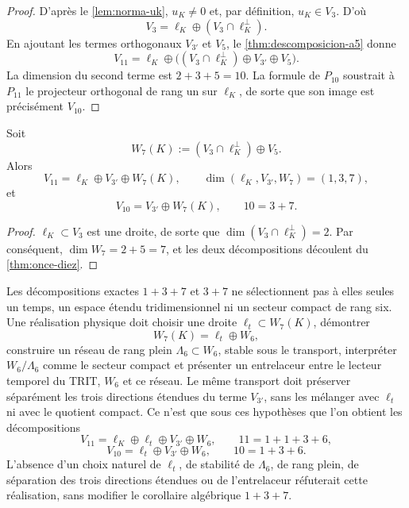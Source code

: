 \begin{proof}
D'après le \cref{lem:norma-uk}, \(u_K\neq0\) et, par définition, \(u_K\in V_3\).
D'où
\[
V_3=\ell_K\oplus(V_3\cap\ell_K^\perp).
\]
En ajoutant les termes orthogonaux \(V_{3'}\) et \(V_5\), le
\cref{thm:descomposicion-a5} donne
\[
V_{11}=\ell_K\oplus
\bigl((V_3\cap\ell_K^\perp)\oplus V_{3'}\oplus V_5\bigr).
\]
La dimension du second terme est \(2+3+5=10\). La formule de \(P_{10}\)
soustrait à \(P_{11}\) le projecteur orthogonal de rang un sur \(\ell_K\), de
sorte que son image est précisément \(V_{10}\).
\end{proof}

\begin{corollary}
\label{cor:descomposicion-1-3-7}
Soit
\[
W_7(K):=(V_3\cap\ell_K^\perp)\oplus V_5.
\]
Alors
\[
\boxed{
V_{11}=\ell_K\oplus V_{3'}\oplus W_7(K),
\qquad
\dim(\ell_K,V_{3'},W_7)=(1,3,7),}
\]
et
\[
\boxed{
V_{10}=V_{3'}\oplus W_7(K),
\qquad 10=3+7.}
\]
\end{corollary}

\begin{proof}
\(\ell_K\subset V_3\) est une droite, de sorte que
\(\dim(V_3\cap\ell_K^\perp)=2\). Par conséquent,
\(\dim W_7=2+5=7\), et les deux décompositions découlent du
\cref{thm:once-diez}.
\end{proof}

\begin{remark}
\label{rem:interfaz-1-3-6}
Les décompositions exactes \(1+3+7\) et \(3+7\) ne sélectionnent pas à elles seules
un temps, un espace étendu tridimensionnel ni un secteur compact de rang
six. Une réalisation physique doit choisir une droite
\(\ell_t\subset W_7(K)\), démontrer
\[
W_7(K)=\ell_t\oplus W_6,
\]
construire un réseau de rang plein
\(\Lambda_6\subset W_6\), stable sous le transport, interpréter
\(W_6/\Lambda_6\) comme le secteur compact et présenter un entrelaceur entre le
lecteur temporel du TRIT, \(W_6\) et ce réseau. Le même transport doit
préserver séparément les trois directions étendues du terme
\(V_{3'}\), sans les mélanger avec \(\ell_t\) ni avec le quotient compact. Ce n'est que
sous ces hypothèses que l'on obtient les décompositions
\[
\boxed{
V_{11}=\ell_K\oplus\ell_t\oplus V_{3'}\oplus W_6,
\qquad 11=1+1+3+6,}
\]
\[
\boxed{
V_{10}=\ell_t\oplus V_{3'}\oplus W_6,
\qquad 10=1+3+6.}
\]
L'absence d'un choix naturel de \(\ell_t\), de stabilité de
\(\Lambda_6\), de rang plein, de séparation des trois directions
étendues ou de l'entrelaceur réfuterait cette réalisation, sans modifier le
corollaire algébrique \(1+3+7\).
\end{remark}

